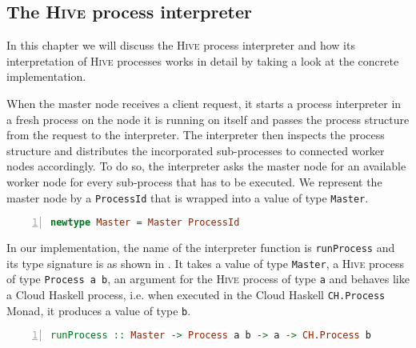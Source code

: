 \subsection{The \textsc{Hive} process interpreter}
\label{chp:interpreter}
In this chapter we will discuss the \textsc{Hive} process interpreter and how its interpretation of \textsc{Hive} processes works in detail by taking a look at the concrete implementation.

When the master node receives a client request, it starts a process interpreter in a fresh process on the node it is running on itself and passes the process structure from the request to the interpreter. The interpreter then inspects the process structure and distributes the incorporated sub-processes to connected worker nodes accordingly. To do so, the interpreter asks the master node for an available worker node for every sub-process that has to be executed. We represent the master node by a \texttt{ProcessId} that is wrapped into a value of type \texttt{Master}.
\begin{lstlisting}[language=Haskell,caption=Data type for the address of a master node.,numbers=left,frame=bt]
newtype Master = Master ProcessId
\end{lstlisting}

In our implementation, the name of the interpreter function is \texttt{runProcess} and its type signature is as shown in . It takes a value of type \texttt{Master}, a \textsc{Hive} process of type \texttt{Process a b}, an argument for the \textsc{Hive} process of type \texttt{a} and behaves like a \textsf{Cloud Haskell} process, i.e. when executed in the \textsf{Cloud Haskell} \texttt{CH.Process} Monad, it produces a value of type \texttt{b}.
\begin{lstlisting}[language=Haskell,caption=Signature of the process interpreter.,label=lst:interpreter_signature,numbers=left,frame=bt]
runProcess :: Master -> Process a b -> a -> CH.Process b
\end{lstlisting}

